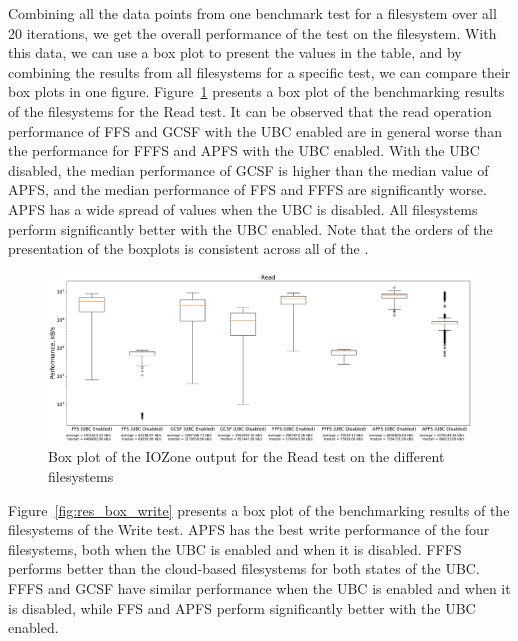

Combining all the data points from one benchmark test for a filesystem over all 20 iterations, we get the overall performance of the test on the filesystem. With this data, we can use a box plot to present the values in the table, and by combining the results from all filesystems for a specific test, we can compare their box plots in one figure. Figure~\ref{fig:res_box_read} presents a box plot of the benchmarking results of the filesystems for the Read test. It can be observed that the read operation performance of \gls{FFS} and \gls{GCSF} with the \gls{UBC} enabled are in general worse than the performance for \gls{FFFS} and \gls{APFS} with the \gls{UBC} enabled. With the \gls{UBC} disabled, the median performance of \gls{GCSF} is higher than the median value of \gls{APFS}, and the median performance of \gls{FFS} and \gls{FFFS} are significantly worse. \gls{APFS} has a wide spread of values when the \gls{UBC} is disabled. All filesystems perform significantly better with the \gls{UBC} enabled. Note that the orders of the presentation of the boxplots is consistent across all of the .

\begin{figure}
	\label{fig:res_box_read}
	\begin{center}
		\includegraphics[width=1.0\textwidth]{figures.nosync/benchmarking/Read-boxplot.pdf}
	\end{center}
	\caption[Box plot of the IOZone output for the Read test]{Box plot of the IOZone output for the Read test on the different filesystems}
\end{figure}

\FloatBarrier

Figure~\ref{fig:res_box_write} presents a box plot of the benchmarking results of the filesystems of the Write test. \gls{APFS} has the best write performance of the four filesystems, both when the \gls{UBC} is enabled and when it is disabled. \gls{FFFS} performs better than the \mbox{cloud-based} filesystems for both states of the \gls{UBC}. \gls{FFFS} and \gls{GCSF} have similar performance when the \gls{UBC} is enabled and when it is disabled, while \gls{FFS} and \gls{APFS} perform significantly better with the \gls{UBC} enabled.


